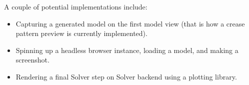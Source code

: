 \medskip


A couple of potential implementations include:

\begin{itemize}
	\item Capturing a generated model on the first model view (that is how a crease pattern preview is currently implemented).
	\item Spinning up a headless browser instance, loading a model, and making a screenshot.
	\item Rendering a final Solver step on Solver backend using a plotting library.
\end{itemize}


